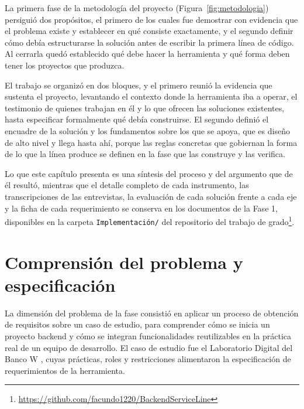 \label{cap:fundamentacion}

La primera fase de la metodología del proyecto (Figura~\ref{fig:metodologia})
persiguió dos propósitos, el primero de los cuales fue demostrar con evidencia
que el problema existe y establecer en qué consiste exactamente, y el segundo
definir cómo debía estructurarse la solución antes de escribir la primera
línea de código. Al cerrarla quedó establecido qué debe hacer la herramienta y
qué forma deben tener los proyectos que produzca.

El trabajo se organizó en dos bloques, y el primero reunió la
evidencia que sustenta el proyecto, levantando el contexto donde la
herramienta iba a operar, el testimonio de quienes trabajan en él y lo que
ofrecen las soluciones existentes, hasta especificar formalmente qué debía
construirse. El segundo definió el encuadre de la solución y los fundamentos
sobre los que se apoya, que es diseño de alto nivel y llega hasta ahí, porque
las reglas concretas que gobiernan la forma de lo que la línea produce se
definen en la fase que las construye y las verifica.

Lo que este capítulo presenta es una síntesis del proceso y del argumento que
de él resultó, mientras que el detalle completo de cada instrumento, las
transcripciones de las entrevistas, la evaluación de cada solución frente a
cada eje y la ficha de cada requerimiento se conserva en los documentos de la
Fase 1, disponibles en la carpeta \texttt{Implementación/} del repositorio del
trabajo de
grado\footnote{\url{https://github.com/facundo1220/BackendServiceLine}}.

\section{Comprensión del problema y especificación}
\label{sec:comprension-problema}

La dimensión del problema de la fase consistió en aplicar un proceso de
obtención de requisitos sobre un caso de estudio, para comprender cómo se
inicia un proyecto backend y cómo se integran funcionalidades reutilizables en
la práctica real de un equipo de desarrollo.
El caso de estudio fue el Laboratorio Digital del Banco W
\citep{UniversidadIcesi2023}, cuyas prácticas, roles y restricciones
alimentaron la especificación de requerimientos de la herramienta.

